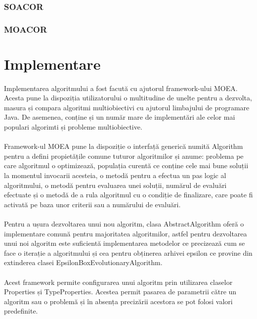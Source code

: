 \documentclass[12pt]{article}
\begin{document}
\subsubsection{SOACOR}
\subsubsection{MOACOR}
\section{Implementare}
\paragraph{}
Implementarea algoritmului a fost facută cu ajutorul framework-ului MOEA. Acesta pune la dispoziția utilizatorului o multitudine de unelte pentru a dezvolta, masura și compara algoritmi multiobiectivi cu ajutorul limbajului de programare Java. De asemenea, conține și un număr mare de implementări ale celor mai populari algorimti și probleme multiobiective.
\paragraph{}
Framework-ul MOEA pune la dispoziție o interfață generică numită Algorithm pentru a defini propietățile comune tuturor algoritmilor și anume: problema pe care algoritmul o optimizează, populația curentă ce conține cele mai bune soluții la momentul invocarii acesteia, o metodă pentru a efectua un pas logic al algoritmului, o metodă pentru evaluarea unei soluții, numărul de evaluări efectuate și o metodă de a rula algoritmul cu o condiție de finalizare, care poate fi activată pe baza unor criterii sau a numărului de evaluări.
\paragraph{}
Pentru a ușura dezvoltarea unui nou algoritm, clasa AbstractAlgorithm oferă o implementare comună pentru majoritatea algoritmilor, astfel pentru dezvoltarea unui noi algoritm este suficientă  implementarea metodelor ce precizează cum se face o iterație a algoritmului și cea pentru obținerea arhivei epsilon ce provine din extinderea clasei EpsilonBoxEvolutionaryAlgorithm.
\paragraph{}
Acest framework permite configurarea unui algoritm prin utilizarea claselor Properties și TypeProperties. Acestea permit pasarea de parametrii către un algoritm sau o problemă și în absența precizării acestora se pot folosi valori predefinite.
\end{document}
